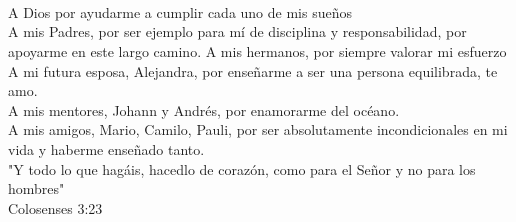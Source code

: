 
\newpage
\thispagestyle{empty} \textbf{}\normalsize
\\\\\\%

\begin{flushright}
\begin{minipage}{8cm}
    \noindent
        \small
        A Dios por ayudarme a cumplir cada uno de mis sueños\\[0.6cm]
        
        A mis Padres, por ser ejemplo para mí de disciplina y responsabilidad, por apoyarme en este largo camino. A mis hermanos, por siempre valorar mi esfuerzo\\[0.6cm]
%        
        A mi futura esposa, Alejandra, por enseñarme a ser una persona equilibrada, te amo.\\[0.6cm]
%        
        A mis mentores, Johann y Andrés, por enamorarme del océano.\\[0.6cm]
%        
        A mis amigos, Mario, Camilo, Pauli, por ser absolutamente incondicionales en mi vida y haberme enseñado tanto.\\[0.6cm]
        
        "Y todo lo que hagáis, hacedlo de corazón, como para el Señor y no para los hombres"\\
		Colosenses 3:23 \\
\end{minipage}
\end{flushright}

%


